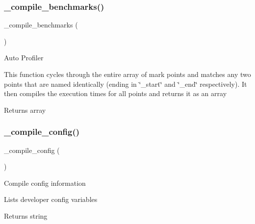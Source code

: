 \subsubsection{\texorpdfstring{\+\_\+compile\+\_\+benchmarks()}{\_compile\_benchmarks()}}
{\footnotesize\ttfamily \+\_\+compile\+\_\+benchmarks (\begin{DoxyParamCaption}{ }\end{DoxyParamCaption})\hspace{0.3cm}{\ttfamily [protected]}}

Auto Profiler

This function cycles through the entire array of mark points and matches any two points that are named identically (ending in \char`\"{}\+\_\+start\char`\"{} and \char`\"{}\+\_\+end\char`\"{} respectively). It then compiles the execution times for all points and returns it as an array

\begin{DoxyReturn}{Returns}
array 
\end{DoxyReturn}
\mbox{\label{class_c_i___profiler_affb7543f1c67a5b3ff24eaefcec37e6d}} 
\subsubsection{\texorpdfstring{\+\_\+compile\+\_\+config()}{\_compile\_config()}}
{\footnotesize\ttfamily \+\_\+compile\+\_\+config (\begin{DoxyParamCaption}{ }\end{DoxyParamCaption})\hspace{0.3cm}{\ttfamily [protected]}}

Compile config information

Lists developer config variables

\begin{DoxyReturn}{Returns}
string 
\end{DoxyReturn}
\mbox{\label{class_c_i___profiler_a46a079522432af283c844f043ba5a513}} 
